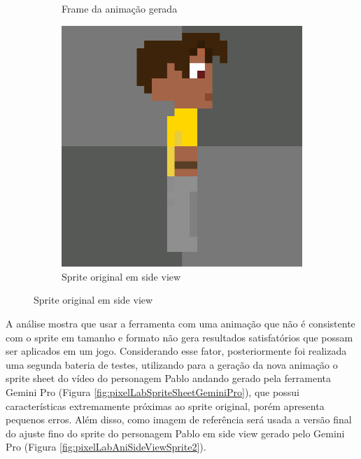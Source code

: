 \begin{figure}[htbp]
\begin{subfigure}{0.32\linewidth}
        \caption{\small Frame da animação gerada }
        \label{fig:pixelLabAnimaComparaGera}
    \end{subfigure}
    \begin{subfigure}{0.32\linewidth}
        \includegraphics[width=0.9\linewidth]{figs/pixelLab/dia3/fixGrande.PNG}
        \caption{\small Sprite original em side view }
        \label{fig:pixelLabAnimaComparaSprite}
    \end{subfigure}
\end{figure}


A análise mostra que usar a ferramenta com uma animação que não é consistente com o sprite em tamanho e formato não gera resultados satisfatórios que possam ser aplicados em um jogo. Considerando esse fator, posteriormente foi realizada uma segunda bateria de testes, utilizando para a geração da nova animação o sprite sheet do vídeo do personagem Pablo andando gerado pela ferramenta Gemini Pro (Figura \ref{fig:pixelLabSpriteSheetGeminiPro}), que possui características extremamente próximas ao sprite original, porém apresenta pequenos erros. Além disso, como imagem de referência será usada a versão final do ajuste fino do sprite do personagem Pablo em side view gerado pelo Gemini Pro (Figura \ref{fig:pixelLabAniSideViewSprite2}).

